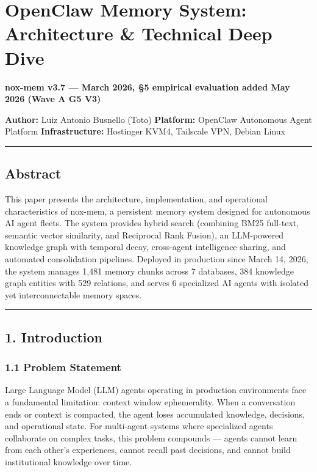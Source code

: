\documentclass[
]{article}
\author{}
\date{}
\begin{document}
\section{OpenClaw Memory System: Architecture \& Technical Deep
Dive}\label{openclaw-memory-system-architecture-technical-deep-dive}

\textbf{nox-mem v3.7 --- March 2026, §5 empirical evaluation added May
2026 (Wave A G5 V3)}

\textbf{Author:} Luiz Antonio Busnello (Toto) \textbf{Platform:}
OpenClaw Autonomous Agent Platform \textbf{Infrastructure:} Hostinger
KVM4, Tailscale VPN, Debian Linux

\begin{center}\rule{0.5\linewidth}{0.5pt}\end{center}

\subsection{Abstract}\label{abstract}

This paper presents the architecture, implementation, and operational
characteristics of nox-mem, a persistent memory system designed for
autonomous AI agent fleets. The system provides hybrid search (combining
BM25 full-text, semantic vector similarity, and Reciprocal Rank Fusion),
an LLM-powered knowledge graph with temporal decay, cross-agent
intelligence sharing, and automated consolidation pipelines. Deployed in
production since March 14, 2026, the system manages 1,481 memory chunks
across 7 databases, 384 knowledge graph entities with 529 relations, and
serves 6 specialized AI agents with isolated yet interconnectable memory
spaces.

\begin{center}\rule{0.5\linewidth}{0.5pt}\end{center}

\subsection{1. Introduction}\label{introduction}

\subsubsection{1.1 Problem Statement}\label{problem-statement}

Large Language Model (LLM) agents operating in production environments
face a fundamental limitation: context window ephemerality. When a
conversation ends or context is compacted, the agent loses accumulated
knowledge, decisions, and operational state. For multi-agent systems
where specialized agents collaborate on complex tasks, this problem
compounds --- agents cannot learn from each other's experiences, cannot
recall past decisions, and cannot build institutional knowledge over
time.
\end{document}
